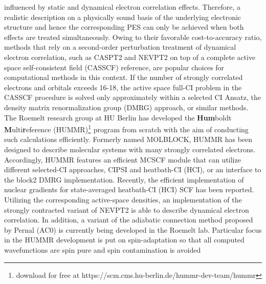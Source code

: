 \documentclass[a4paper,11pt,headings=normal]{scrartcl}
\begin{document}
influenced by static and dynamical electron correlation effects. Therefore, a 
realistic description on a physically sound basis of the underlying electronic 
structure and hence the corresponding PES can only be achieved when both 
effects are treated simultaneously. 
Owing to their favorable cost-to-accuracy ratio, methods that rely on a 
second-order perturbation treatment of dynamical electron correlation, such as 
CASPT2\autocite{Roos1992} and NEVPT2\autocite{Malrieu2002} on top of a complete 
active space self-consistent field (CASSCF) reference, are popular choices for 
computational methods in this context. If the number of strongly correlated 
electrons and orbitals exceeds 16-18, the active space full-CI problem in the 
CASSCF procedure is solved only approximately within a selected CI 
Ansatz,\autocite{Evangelista2016, Umrigar2016a, 
HeadGordon2020, Neese2021, Hoffmann2020, Roemelt2023} the density matrix 
renormalization group (DMRG) approach\autocite{Chan2016c, 
Reiher2020}, or similar methods. The Roemelt research group at HU Berlin has 
developed the \textbf{Hum}boldt \textbf{M}ulti\textbf{r}eference 
(HUMMR)\footnote{download for free at 
https://scm.cms.hu-berlin.de/hummr-dev-team/hummr} 
program from scratch with the aim of conducting such calculations 
efficiently.\autocite{Roemelt2019} Formerly named MOLBLOCK, HUMMR has been 
designed to describe molecular systems with many strongly correlated electrons. 
Accordingly, HUMMR features an efficient MCSCF module that can utilize 
different selected-CI approaches, CIPSI and heatbath-CI 
(HCI),\autocite{Roemelt2023}  or an interface to the block2 DMRG 
implementation.\autocite{Chan2023} Recently, the efficient  
implementation of nuclear gradients for state-averaged heatbath-CI (HCI) SCF has 
been reported.\autocite{Roemelt2025} Utilizing the corresponding active-space 
densities, an implementation of the strongly contracted variant of 
NEVPT2 is able to describe dynamical electron 
correlation.\autocite{Pantazis2018, Roemelt2020a} In addition, a variant of the 
adiabatic connection method proposed by Pernal (AC0)\autocite{Pernal2024} is 
currently being developed in the Roemelt lab. Particular focus 
in the HUMMR development is put on spin-adaptation\autocite{Roemelt2022} so 
that all computed wavefunctions are spin pure and spin contamination is avoided 
\end{document}

